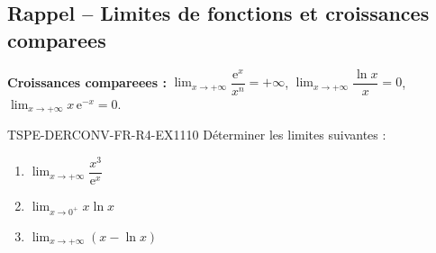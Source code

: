 

\subsection*{Rappel -- Limites de fonctions et croissances comparees}

\textbf{Croissances compareees :} $\lim_{x \to +\infty} \dfrac{\mathrm{e}^x}{x^n} = +\infty$, $\lim_{x \to +\infty} \dfrac{\ln x}{x} = 0$, $\lim_{x \to +\infty} x\,\mathrm{e}^{-x} = 0$.

\begin{exercice}{TSPE-DERCONV-FR-R4-EX1}{1}{10}
Déterminer les limites suivantes :
\begin{enumerate}
  \item $\lim_{x \to +\infty} \dfrac{x^3}{\mathrm{e}^x}$
  \item $\lim_{x \to 0^+} x \ln x$
  \item $\lim_{x \to +\infty} \left(x - \ln x\right)$
\end{enumerate}
\end{exercice}

